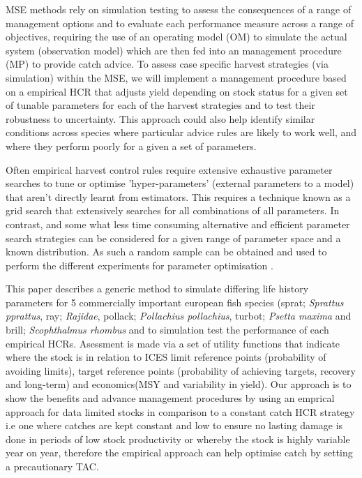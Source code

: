\documentclass[preprint,review,12pt]{elsarticle}
\begin{document}
MSE methods rely on simulation testing to assess the consequences of a range of management options and to evaluate each performance measure across a range of objectives, requiring the use of an operating model (OM) to simulate the actual system (observation model) which are then fed into an management procedure (MP) to provide catch advice. To assess case specific harvest strategies (via simulation) within the MSE, we will implement a management procedure based on a empirical HCR that adjusts yield depending on stock status for a given set of tunable parameters for each of the harvest strategies and to test their robustness to uncertainty.  This approach could also help identify similar conditions across species where particular advice rules are likely to work well, and where they perform poorly for a given a set of parameters. 

Often empirical harvest control rules require extensive exhaustive parameter searches to tune or optimise 'hyper-parameters' (external parameters to a model) that aren’t directly learnt from estimators.  This requires a technique known as a grid search that extensively searches for all combinations of all parameters. In contrast, and some what less time consuming alternative and efficient parameter search strategies can be considered for a given range of parameter space and a known distribution.  As such a random sample can be obtained and used to perform the different experiments for parameter optimisation \cite{bergstra2012random}. 

This paper describes a generic method to simulate differing life history parameters for 5 commercially important european fish species  (sprat; \emph{Sprattus pprattus}, ray; \emph{Rajidae}, pollack; \emph{Pollachius pollachius}, turbot; \emph{Psetta maxima} and brill; \emph{Scophthalmus rhombus} and to simulation test the performance of each empirical HCRs.  Asessment is made via a set of utility functions that indicate where the stock is in relation to ICES limit reference points (probability of avoiding limits), target reference points (probability of achieving targets, recovery and long-term) and economics(MSY and variability in yield). Our approach is to show the benefits and advance management procedures by using an emprical approach for data limited stocks in comparison to a constant catch HCR strategy i.e one where catches are kept constant and low to ensure no lasting damage is done in periods of low stock productivity or whereby the stock is highly variable year on year, therefore the empirical approach can help optimise catch by setting a precautionary TAC. 
\end{document}
